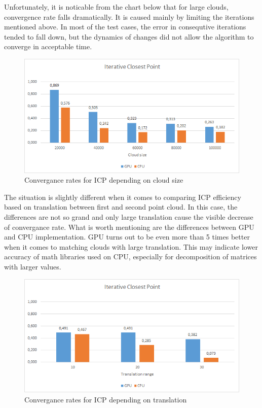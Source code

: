 \documentclass[titlepage]{article}
\begin{document}
Unfortunately, it is noticable from the chart below that for large clouds, convergence rate falls dramatically. It is caused mainly by limiting the iterations mentioned above. In most of the test cases, the error in consequtive iterations tended to fall down, but the dynamics of changes did not allow the algorithm to converge in acceptable time.
\begin{figure}[H]
\includegraphics[width=\textwidth]{ss-icp-1.png}
\caption{Convergance rates for ICP depending on cloud size}
\end{figure}
The situation is slightly different when it comes to comparing ICP efficiency based on translation between first and second point cloud. In this case, the differences are not so grand and only large translation cause the visible decrease of convergance rate. What is worth mentioning are the differences between GPU and CPU implementation. GPU turns out to be even more than 5 times better when it comes to matching clouds with large translation. This may indicate lower accuracy of math libraries used on CPU, especially for decomposition of matrices with larger values. 
\begin{figure}[H]
\includegraphics[width=\textwidth]{ss-icp-2.png}
\caption{Convergance rates for ICP depending on translation}
\end{figure}
\end{document}

